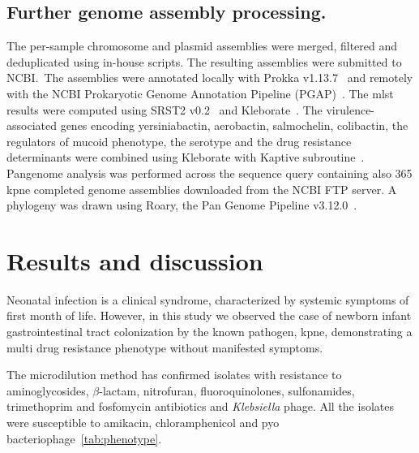 \documentclass[12pt,a4paper]{article}
\newcommand{\betalactam}{$\beta$-lactam}
\begin{document}
\subsection{Further genome assembly processing.}\label{subsec:proc_ass}
The per-sample chromosome and plasmid assemblies were merged, filtered and deduplicated using in-house scripts.
The resulting assemblies were submitted to NCBI.\
The assemblies were annotated locally with Prokka v1.13.7~\cite{Prokka}
and remotely with the NCBI Prokaryotic Genome Annotation Pipeline (PGAP)~\cite{PGAP}.
The \gls{mlst} results were computed using SRST2 v0.2~\cite{SRST2}
and Kleborate~\cite{Kleborate}.
The virulence-associated genes encoding yersiniabactin, aerobactin, salmochelin, colibactin, the regulators of mucoid
phenotype, the serotype and the drug resistance determinants were combined using Kleborate with
Kaptive subroutine~\cite{Kaptive}.
Pangenome analysis was performed across the sequence query containing also 365 \gls{kpne} completed genome assemblies
downloaded from the NCBI FTP server.
A phylogeny was drawn using Roary, the Pan Genome Pipeline v3.12.0~\cite{Roary}.

\section{Results and discussion}\label{sec:res_dis}
Neonatal infection is a clinical syndrome, characterized by systemic symptoms of first month of life.
However, in this study we observed the case of newborn infant gastrointestinal tract colonization by the known
pathogen, \gls{kpne}, demonstrating a multi drug resistance phenotype without manifested symptoms.

The microdilution method has confirmed isolates with resistance to aminoglycosides, \betalactam,
nitrofuran, fluoroquinolones, sulfonamides, trimethoprim and fosfomycin antibiotics and \textit{Klebsiella} phage.
All the isolates were susceptible to amikacin, chloramphenicol and pyo bacteriophage~\ref{tab:phenotype}.
\end{document}
